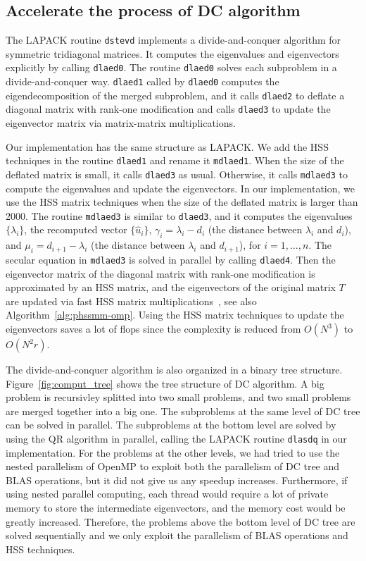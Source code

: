 \documentclass[times]{nlaauth}
\newcounter{algorithm}
\begin{document}
\subsection{Accelerate the process of DC algorithm}

The LAPACK routine \texttt{dstevd} implements a divide-and-conquer algorithm for
symmetric tridiagonal matrices.
It computes the eigenvalues and eigenvectors
explicitly by calling \texttt{dlaed0}.
The routine \texttt{dlaed0} solves each subproblem in a divide-and-conquer way.
\texttt{dlaed1} called by \texttt{dlaed0} computes the eigendecomposition of the merged subproblem,
and it calls \texttt{dlaed2} to deflate a diagonal matrix with rank-one modification and calls \texttt{dlaed3}
to update the eigenvector matrix via matrix-matrix multiplications.

Our implementation has the same structure as LAPACK.
We add the HSS techniques in the routine \texttt{dlaed1} and rename it \texttt{mdlaed1}.
When the size of the deflated matrix is small, it calls \texttt{dlaed3} as usual.
Otherwise, it calls \texttt{mdlaed3} to compute the eigenvalues and
update the eigenvectors.
In our implementation, we use the HSS matrix techniques when the size of the deflated matrix
is larger than 2000. The routine \texttt{mdlaed3} is similar to
\texttt{dlaed3}, and it computes the
eigenvalues $\{\lambda_i\}$, the recomputed vector $\{\hat{u}_i\}$,
$\gamma_i=\lambda_i-d_i$ (the distance between $\lambda_i$ and $d_i$),
and $\mu_i=d_{i+1}-\lambda_i$ (the distance between $\lambda_i$ and $d_{i+1}$), for $i=1,\ldots,n$.
The secular equation in \texttt{mdlaed3} is solved in parallel by calling \texttt{dlaed4}.
Then the eigenvector matrix of the diagonal matrix with rank-one modification is approximated
by an HSS matrix, and the eigenvectors of the original matrix $T$ are updated via
fast HSS matrix multiplications~\cite{Lyons-thesis}, see also Algorithm~\ref{alg:phssmm-omp}.
Using the HSS matrix techniques to update the eigenvectors saves a lot of flops since
the complexity is reduced from $O(N^3)$ to $O(N^2r)$.

The divide-and-conquer algorithm is also organized in a binary tree structure.
Figure~\ref{fig:comput_tree} shows the tree structure of DC algorithm.
A big problem is recursivley splitted into two small problems, and two small problems
are merged together into a big one.
The subproblems at the same level of DC tree can be solved
in parallel.
The subproblems at the bottom level are solved by using the QR algorithm in parallel, calling
the LAPACK routine \texttt{dlasdq} in our implementation.
For the problems at the other levels, we
had tried to use the nested parallelism of OpenMP to exploit both the parallelism of DC tree and
BLAS operations, but it did not give us any speedup increases.
Furthermore, if using nested parallel computing, each thread would require a lot of private memory to store the intermediate eigenvectors, and the
memory cost would be greatly increased.
Therefore, the problems above the bottom level of DC tree are solved sequentially and
we only exploit the parallelism of BLAS operations and HSS techniques.
\end{document}
